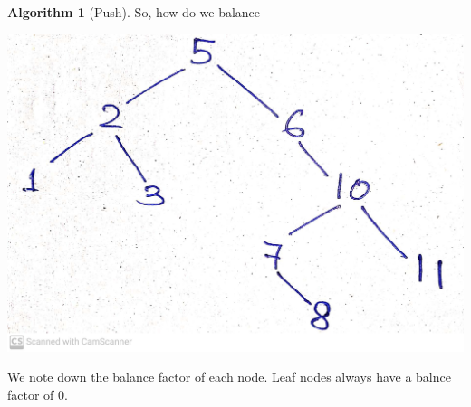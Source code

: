 \documentclass[10pt, a4paper]{extarticle}
\theoremstyle{definition}
\newtheorem{alg}{Algorithm}
\begin{document}
\begin{alg}[Push]
		So, how do we balance
		\begin{center}
			\includegraphics[scale=0.08]{bst1.jpg}\\
		\end{center}
		We note down the balance factor of each node. Leaf nodes always have a balnce factor of 0.


\end{alg}
\end{document}
